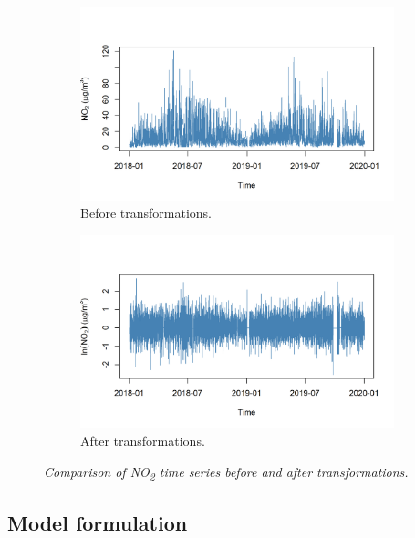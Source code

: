 \documentclass[a4paper, 10pt, fleqn]{article}
\begin{document}
\begin{flushleft}
      \begin{figure}[H]
         \centering
         \begin{subfigure}{0.48\linewidth}
            \centering
            \includegraphics[width=\linewidth]{../img/extracted_no2.png}
            \caption{Before transformations.}
         \end{subfigure}
         \hfill
         \begin{subfigure}{0.48\linewidth}
            \centering
            \includegraphics[width=\linewidth]{../img/stationary_no2.png}
            \caption{After transformations.}
         \end{subfigure}
         \caption{\textit{Comparison of NO\textsubscript{2} time series before and after transformations.}}
      \end{figure}

      \subsection*{Model formulation}

\end{flushleft}
\end{document}
